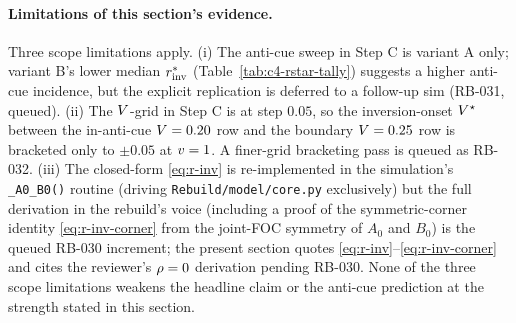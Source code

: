\paragraph{Limitations of this section's evidence.}
Three scope limitations apply. (i) The anti-cue sweep in Step C is
variant A only; variant B's lower median $r^{*}_{\mathrm{inv}}$
(Table~\ref{tab:c4-rstar-tally}) suggests a higher anti-cue
incidence, but the explicit replication is deferred to a follow-up
sim (RB-031, queued). (ii) The $V$-grid in Step C is at step
$0.05$, so the inversion-onset $V^\star$ between the in-anti-cue
$V = 0.20$ row and the boundary $V = 0.25$ row is bracketed
only to $\pm 0.05$ at $v = 1$. A finer-grid bracketing pass is
queued as RB-032. (iii) The closed-form \eqref{eq:r-inv} is
re-implemented in the simulation's
\texttt{\_A0\_B0()} routine (driving \texttt{Rebuild/model/core.py}
exclusively) but the full derivation in the rebuild's voice
(including a proof of the symmetric-corner identity
\eqref{eq:r-inv-corner} from the joint-FOC symmetry of $A_0$ and
$B_0$) is the queued RB-030 increment; the present section quotes
\eqref{eq:r-inv}--\eqref{eq:r-inv-corner} and cites the reviewer's
$\rho = 0$ derivation pending RB-030. None of the three scope
limitations weakens the headline claim or the anti-cue prediction
at the strength stated in this section.

